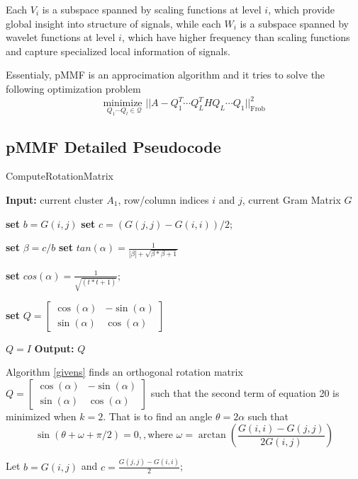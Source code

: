 \documentclass[a4paper]{article}
\newcommand{\Frob}{\text{Frob}}
\begin{document}
Each $V_i$ is a subspace spanned by scaling functions at level $i$, which provide global insight into structure of signals, while each $W_i$ is a subspace spanned by wavelet functions at level $i$, which have higher frequency than scaling functions and capture specialized local information of signals.


Essentialy, pMMF is an approcimation algorithm and it tries to solve the following optimization problem
\[\underset{Q_1\cdots Q_l \in \mathcal{Q}}{\text{minimize }} ||A - Q_1^T\cdots Q_L^THQ_L\cdots Q_1||^2_{\Frob}\]

\subsection{pMMF Detailed Pseudocode}

\begin{algorithm}[H]
\caption{ComputeRotationMatrix}\label{givens}
\begin{algorithmic}[1]
\State \textbf{Input:} current cluster $A_1$, row/column indices $i$ and $j$, current Gram Matrix $G$

\State \textbf{set} $b = G(i, j)$
\State \textbf{set} $c = (G(j, j) - G(i, i))/2$;

\State \textbf{set} $\beta = c / b$
\State \textbf{set} $tan(\alpha) = \frac{1}{|\beta| + \sqrt{\beta * \beta + 1}}$

\State \textbf{set}  $cos(\alpha) = \frac{1}{\sqrt{(t * t + 1)}}$;

\State \textbf{set}   $Q = \begin{bmatrix}
\cos(\alpha) & -\sin(\alpha) \\
\sin(\alpha)  & \cos(\alpha)
\end{bmatrix}$
\Else

$Q = I$
\EndIf
\State \textbf{Output:} $Q$
\end{algorithmic}
\end{algorithm}

Algorithm \ref{givens} finds an orthogonal rotation matrix $Q = \begin{bmatrix}
\cos(\alpha) & -\sin(\alpha) \\
\sin(\alpha)  & \cos(\alpha)
\end{bmatrix}$
 such that the second term of equation 20 is minimized when $k = 2$. That is to find an angle $\theta = 2\alpha$ such that $$\sin(\theta + \omega +\pi/2) = 0,, \text{where } \omega = \arctan(\frac{G(i,i) - G(j,j)}{2G(i,j)})$$
 
 Let $b = G(i, j)$ and $c = \frac{G(j, j) - G(i, i)}{2}$;
 
\end{document}
